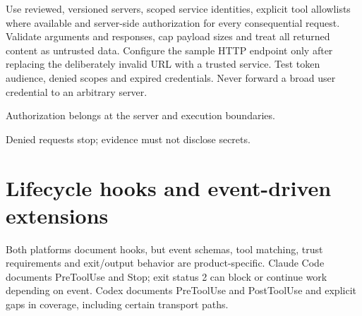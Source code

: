 \documentclass[11pt,letterpaper]{article}
\begin{document}
Use reviewed, versioned servers, scoped service identities, explicit tool allowlists where available and server-side authorization for every consequential request. Validate arguments and responses, cap payload sizes and treat all returned content as untrusted data. Configure the sample HTTP endpoint only after replacing the deliberately invalid URL with a trusted service. Test token audience, denied scopes and expired credentials. Never forward a broad user credential to an arbitrary server.

\begin{center}\begin{minipage}{\linewidth}\captionsetup{type=figure}\centering{}\caption{MCP integration architecture}
\small Authorization belongs at the server and execution boundaries.\end{minipage}\end{center}
\begin{center}\begin{minipage}{\linewidth}\captionsetup{type=figure}\centering{}\caption{Tool authorization lifecycle}
\small Denied requests stop; evidence must not disclose secrets.\end{minipage}\end{center}
\section{Lifecycle hooks and event-driven extensions}
Both platforms document hooks, but event schemas, tool matching, trust requirements and exit/output behavior are product-specific. Claude Code documents PreToolUse and Stop; exit status 2 can block or continue work depending on event. Codex documents PreToolUse and PostToolUse and explicit gaps in coverage, including certain transport paths. \cite{chooks,ohooks}
\end{document}
